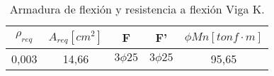     \begin{table}[H]
      \centering
      \caption{Armadura de flexión y resistencia a flexión Viga K.}
        \begin{tabular}{ccccc}
        \hline
        \boldmath{}\textbf{$\rho_{req}$}\unboldmath{} & \boldmath{}\textbf{$A_{req} [cm^2]$}\unboldmath{} & \textbf{F} & \textbf{F'} & \boldmath{}\textbf{$\phi Mn [tonf \cdot m]$}\unboldmath{} \bigstrut\\
        \hline
        0,003 & 14,66 & $3 \phi 25$ & $3 \phi 25$ & 95,65 \bigstrut\\
        \hline
        \end{tabular}%
      \label{arm.flexion.k}%
    \end{table}%